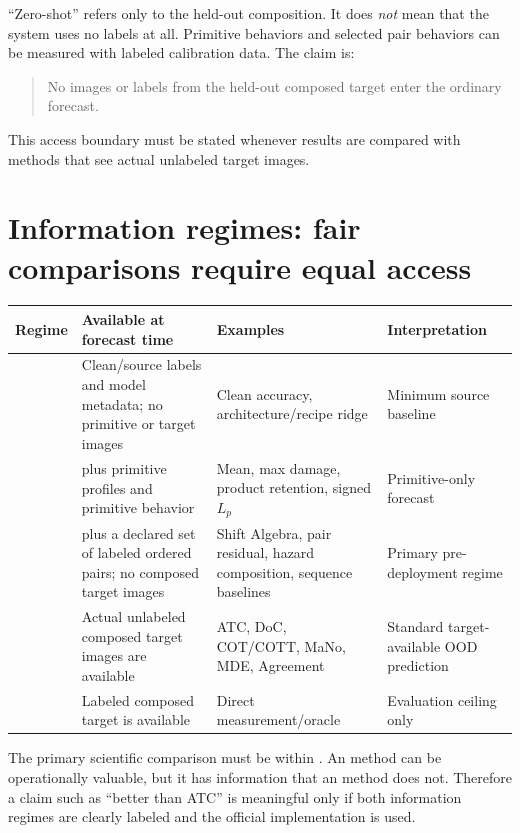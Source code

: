 \documentclass[11pt,a4paper]{article}
\newcommand{\Rzero}{\mathrm{R0}}
\newcommand{\Rone}{\mathrm{R1}}
\newcommand{\Rtwo}{\mathrm{R2}}
\newcommand{\Rthree}{\mathrm{R3}}
\newcommand{\Rfour}{\mathrm{R4}}
\begin{document}
``Zero-shot'' refers only to the held-out composition.  It does \emph{not}
mean that the system uses no labels at all.  Primitive behaviors and selected
pair behaviors can be measured with labeled calibration data.  The claim is:
\begin{quote}
No images or labels from the held-out composed target enter the ordinary
\Rtwo{} forecast.
\end{quote}
This access boundary must be stated whenever results are compared with methods
that see actual unlabeled target images.

\section{Information regimes: fair comparisons require equal access}

\begin{center}
\begin{tabular}{P{1.2cm}P{5.4cm}P{4.6cm}P{3.5cm}}
\toprule
\textbf{Regime} & \textbf{Available at forecast time} & \textbf{Examples} & \textbf{Interpretation} \\
\midrule
\Rzero{} & Clean/source labels and model metadata; no primitive or target images & Clean accuracy, architecture/recipe ridge & Minimum source baseline \\
\Rone{} & \Rzero{} plus primitive profiles and primitive behavior & Mean, max damage, product retention, signed $L_p$ & Primitive-only forecast \\
\Rtwo{} & \Rone{} plus a declared set of labeled ordered pairs; no composed target images & Shift Algebra, pair residual, hazard composition, sequence baselines & Primary pre-deployment regime \\
\Rthree{} & Actual unlabeled composed target images are available & ATC, DoC, COT/COTT, MaNo, MDE, Agreement & Standard target-available OOD prediction \\
\Rfour{} & Labeled composed target is available & Direct measurement/oracle & Evaluation ceiling only \\
\bottomrule
\end{tabular}
\end{center}

The primary scientific comparison must be within \Rtwo{}.  An \Rthree{} method
can be operationally valuable, but it has information that an \Rtwo{} method
does not.  Therefore a claim such as ``better than ATC'' is meaningful only if
both information regimes are clearly labeled and the official implementation
is used.
\end{document}
